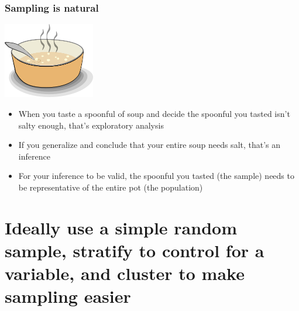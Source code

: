 \documentclass[11pt]{beamer}
\begin{document}
\begin{frame}
\frametitle{Sampling is natural}

\begin{center}
\includegraphics[width=0.3\textwidth]{figures/soup}
\end{center}

\begin{itemize}

\item When you taste a spoonful of soup and decide the spoonful you tasted isn't salty 
enough, that's \alert{exploratory analysis}

\item If you generalize and conclude that your entire soup needs salt, that's an \alert{
inference}

\item For your inference to be valid, the spoonful you tasted (the sample) needs to be 
\alert{representative} of the entire pot (the population)

\end{itemize}

\end{frame}


\section{Ideally use a simple random sample, stratify to control for a variable, and cluster to make sampling easier} 
\label{mi2}
\end{document}
